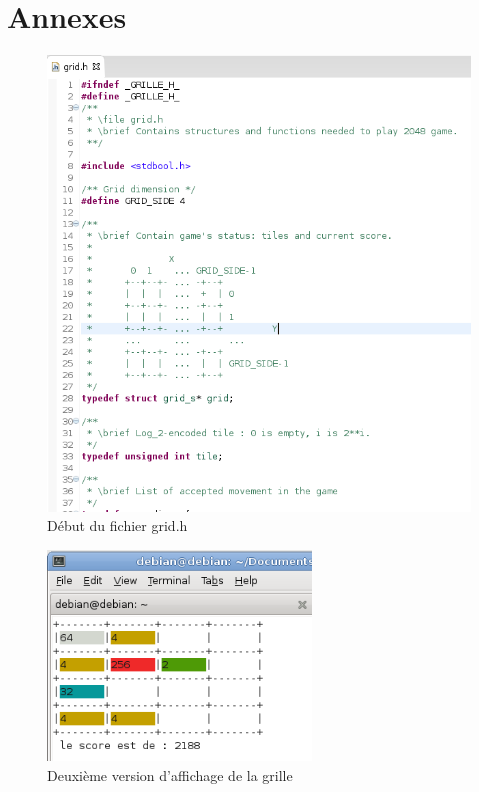 \documentclass[12pt]{article}
\begin{document}
\section{Annexes}
\listoffigures
\begin{figure}
   \caption{\label{grid_h} Début du fichier grid.h}
   \includegraphics[scale=0.6]{grid_h.png}
\end{figure}

\begin{figure}
   \caption{\label{grille_couleur} Deuxième version d'affichage de la grille}
   \includegraphics[width=7cm]{grille_couleur.png}
\end{figure}
\end{document}
